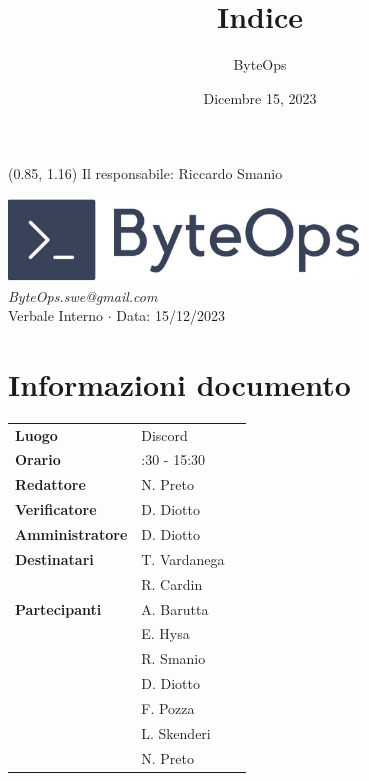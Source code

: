 \documentclass{article}
\title{\textbf{\fontsize{28}{6}\selectfont Indice}}
\author{\fontsize{14}{6}\selectfont ByteOps}
\date{Dicembre 15, 2023}
\begin{document}
\begin{textblock*}{\textwidth}(0.85\textwidth, 1.16\textheight)
    Il responsabile: Riccardo Smanio
\end{textblock*}

\pagestyle{fancy}
\begin{center}
\includegraphics[width = 0.7\textwidth]{../../Images/logo.png} \\
\vspace{0.2cm}
\textcolor[RGB]{60, 60, 60}{\textit{ByteOps.swe@gmail.com}} \\
\vspace{1cm}
\fontsize{16}{6}\selectfont Verbale Interno $\cdot$ Data: 15/12/2023 \\
\vspace{0.5cm}
\end{center}

\section*{Informazioni documento}
\def\arraystretch{1.2}
\begin{tabular}{>{\raggedleft\arraybackslash}p{}|>{\raggedright\arraybackslash}p{}c}
\hline
\addlinespace
\textbf{Luogo} & Discord \vspace{10pt} \\
\textbf{Orario} & 14:30 - 15:30 \vspace{10pt} \\
\textbf{Redattore} & N. Preto \vspace{10pt} \\
\textbf{Verificatore} & D. Diotto \vspace{10pt} \\
\textbf{Amministratore} & D. Diotto \vspace{10pt} \\
\textbf{Destinatari} & T. Vardanega \\ & R. Cardin \vspace{10pt} \\
\textbf{Partecipanti} & A. Barutta \\ & E. Hysa \\ & R. Smanio \\ & D. Diotto \\ & F. Pozza \\ & L. Skenderi \\ & N. Preto \vspace{10pt} \\
\end{tabular}
\pagebreak 
\end{document}
